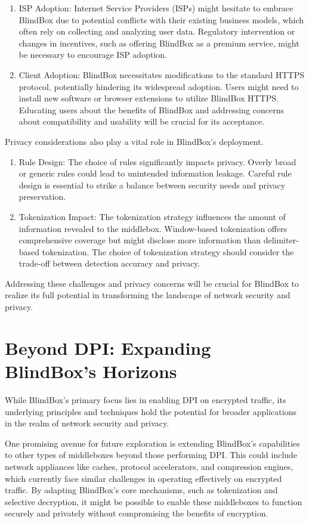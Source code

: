 \documentclass[conference]{IEEEtran}
\begin{document}
\begin{enumerate}
    \item ISP Adoption: Internet Service Providers (ISPs) might hesitate to embrace BlindBox due to potential conflicts with their existing business models, which often rely on collecting and analyzing user data. Regulatory intervention or changes in incentives, such as offering BlindBox as a premium service, might be necessary to encourage ISP adoption.
    \item Client Adoption: BlindBox necessitates modifications to the standard HTTPS protocol, potentially hindering its widespread adoption. Users might need to install new software or browser extensions to utilize BlindBox HTTPS. Educating users about the benefits of BlindBox and addressing concerns about compatibility and usability will be crucial for its acceptance.
\end{enumerate}
Privacy considerations also play a vital role in BlindBox's deployment.
\begin{enumerate}
    \item Rule Design: The choice of rules significantly impacts privacy. Overly broad or generic rules could lead to unintended information leakage. Careful rule design is essential to strike a balance between security needs and privacy preservation.
    \item Tokenization Impact: The tokenization strategy influences the amount of information revealed to the middlebox. Window-based tokenization offers comprehensive coverage but might disclose more information than delimiter-based tokenization. The choice of tokenization strategy should consider the trade-off between detection accuracy and privacy.
\end{enumerate}
Addressing these challenges and privacy concerns will be crucial for BlindBox to realize its full potential in transforming the landscape of network security and privacy.

\section{Beyond DPI: Expanding BlindBox's Horizons}
While BlindBox's primary focus lies in enabling DPI on encrypted traffic, its underlying principles and techniques hold the potential for broader applications in the realm of network security and privacy.

One promising avenue for future exploration is extending BlindBox's capabilities to other types of middleboxes beyond those performing DPI. This could include network appliances like caches, protocol accelerators, and compression engines, which currently face similar challenges in operating effectively on encrypted traffic. By adapting BlindBox's core mechanisms, such as tokenization and selective decryption, it might be possible to enable these middleboxes to function securely and privately without compromising the benefits of encryption.
\end{document}
